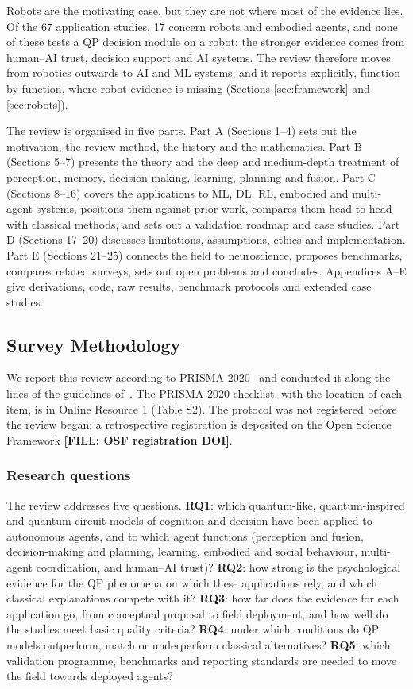 \documentclass[pdflatex,sn-basic]{sn-jnl}
\newcommand{\fillin}[1]{{\color{red}\bfseries [FILL: #1]}}
\begin{document}
Robots are the motivating case, but they are not where most of the evidence lies. Of the 67 application studies, 17 concern robots and embodied agents, and none of these tests a QP decision module on a robot; the stronger evidence comes from human--AI trust, decision support and AI systems. The review therefore moves from robotics outwards to AI and ML systems, and it reports explicitly, function by function, where robot evidence is missing (Sections \ref{sec:framework} and \ref{sec:robots}).

The review is organised in five parts. Part A (Sections 1--4) sets out the motivation, the review method, the history and the mathematics. Part B (Sections 5--7) presents the theory and the deep and medium-depth treatment of perception, memory, decision-making, learning, planning and fusion. Part C (Sections 8--16) covers the applications to ML, DL, RL, embodied and multi-agent systems, positions them against prior work, compares them head to head with classical methods, and sets out a validation roadmap and case studies. Part D (Sections 17--20) discusses limitations, assumptions, ethics and implementation. Part E (Sections 21--25) connects the field to neuroscience, proposes benchmarks, compares related surveys, sets out open problems and concludes. Appendices A--E give derivations, code, raw results, benchmark protocols and extended case studies.


\subsection{Survey Methodology}\label{sec:method}
We report this review according to PRISMA 2020~\citep{Page2021} and conducted it along the lines of the guidelines of~\citet{Kitchenham2007}. The PRISMA 2020 checklist, with the location of each item, is in Online Resource 1 (Table S2). The protocol was not registered before the review began; a retrospective registration is deposited on the Open Science Framework \fillin{OSF registration DOI}.

\subsubsection{Research questions}\label{sec:rqs}
The review addresses five questions. \textbf{RQ1}: which quantum-like, quantum-inspired and quantum-circuit models of cognition and decision have been applied to autonomous agents, and to which agent functions (perception and fusion, decision-making and planning, learning, embodied and social behaviour, multi-agent coordination, and human--AI trust)? \textbf{RQ2}: how strong is the psychological evidence for the QP phenomena on which these applications rely, and which classical explanations compete with it? \textbf{RQ3}: how far does the evidence for each application go, from conceptual proposal to field deployment, and how well do the studies meet basic quality criteria? \textbf{RQ4}: under which conditions do QP models outperform, match or underperform classical alternatives? \textbf{RQ5}: which validation programme, benchmarks and reporting standards are needed to move the field towards deployed agents?
\end{document}

